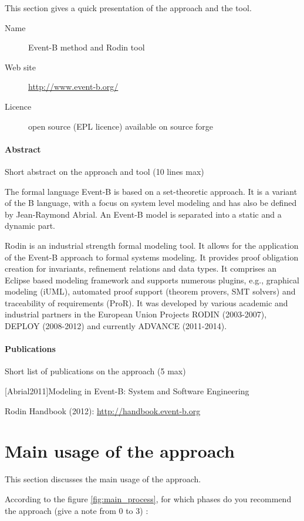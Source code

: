 This section gives a quick presentation of the approach and the tool.

\begin{description}
\item[Name] Event-B method and Rodin tool
\item[Web site] \url{http://www.event-b.org/}
\item[Licence] open source (EPL licence)  available on source forge
\end{description}

\paragraph{Abstract} Short abstract on the approach and tool (10 lines max)

The formal language Event-B is based on a set-theoretic approach. It is a variant of the B
language, with a focus on system level modeling and has also be defined by  Jean-Raymond Abrial. An Event-B model is separated into a static
and a dynamic part.

Rodin is an industrial strength formal modeling tool. It allows for the application of the Event-B approach to formal systems modeling. It provides proof obligation creation for invariants, refinement relations and data types. It comprises an Eclipse based modeling framework and supports numerous plugins, e.g., graphical modeling (iUML), automated proof support (theorem provers, SMT solvers) and traceability of requirements (ProR). It was developed by various academic and industrial partners in the European Union Projects RODIN (2003-2007), DEPLOY (2008-2012) and currently ADVANCE (2011-2014).

\paragraph{Publications} Short list of publications on the approach (5 max)

[Abrial2011]Modeling in Event-B: System and Software Engineering

Rodin Handbook (2012): \url{http://handbook.event-b.org}

\section{Main usage of the approach}
\label{main_usage}
This section discusses the main usage of the approach.

According to the figure \ref{fig:main_process}, for which phases do you recommend the approach (give a note from 0 to  3) :

